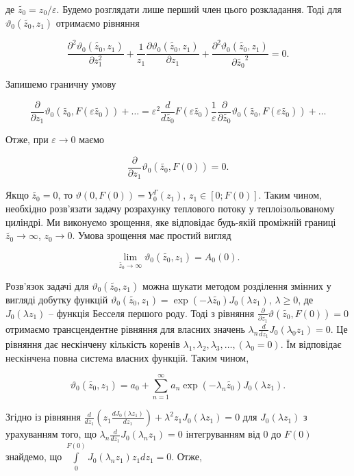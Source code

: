 де $\tilde{z_0} = z_0 / \varepsilon$. Будемо розглядати лише перший член цього розкладання.
Тоді для $\vartheta_0(\tilde{z_0}, z_1)$ отримаємо рівняння

$$
\frac{\partial^2\vartheta_0(\tilde{z_0}, z_1)}{\partial z_1^2} +
\frac{1}{z_1}\frac{\partial\vartheta_0(\tilde{z_0}, z_1)}{\partial z_1} +
\frac{\partial^2\vartheta_0(\tilde{z_0}, z_1)}{\partial\tilde{z_0}^2} = 0.
$$

Запишемо граничну умову

$$
\frac{\partial}{\partial z_1}\vartheta_0(\tilde{z_0}, F(\varepsilon\tilde{z_0})) + \ldots =
\varepsilon^2\frac{d}{d\tilde{z_0}}F(\varepsilon\tilde{z_0})\frac{1}{\varepsilon}\frac{\partial}{\partial\tilde{z_0}}
\vartheta_0(\tilde{z_0}, F(\varepsilon \tilde{z_0})) + \ldots
$$

Отже, при $\varepsilon\to 0$ маємо

$$
\frac{\partial}{\partial z_1}\vartheta_0(\tilde{z_0}, F(0)) = 0.
$$

Якщо $\tilde{z_0} = 0$, то $\vartheta(0, F(0)) = Y_0^\Gamma(z_1)$, $z_1 \in [0; F(0)]$.
Таким чином, необхідно розв’язати задачу розрахунку теплового потоку у теплоізольованому  циліндрі.
Ми виконуємо зрощення, яке відповідає будь-якій проміжній границі $\tilde{z_0} \to \infty$, $z_0 \to 0$.
Умова зрощення має простий вигляд

$$
\lim_{\tilde{z_0} \to \infty} \vartheta_0(\tilde{z_0}, z_1) = A_0(0).
$$

Розв’язок задачі для $\vartheta_0(\tilde{z_0}, z_1)$ можна шукати методом розділення змінних у вигляді
добутку функцій $\vartheta_0(\tilde{z_0}, z_1) = \exp(-\lambda\tilde{z_0})J_0(\lambda z_1)$, $\lambda \geq 0$,
де $J_0(\lambda z_1)$ – функція Бесселя
першого роду. Тоді з рівняння $\frac{\partial}{\partial z_1}\vartheta(\tilde{z_0}, F(0)) = 0$ отримаємо
трансцендентне рівняння для власних значень $\lambda_n\frac{d}{d z_1} J_0(\lambda_0 z_1) = 0$. Це рівняння дає
нескінчену кількість коренів $\lambda_1, \lambda_2, \lambda_3, \ldots, (\lambda_0 = 0)$.
Їм відповідає нескінчена повна система власних функцій. Таким чином,

$$
\vartheta_0(\tilde{z_0}, z_1) = a_0 + \sum_{n = 1}^\infty a_n\exp(-\lambda_n \tilde{z_0}) J_0(\lambda z_1).
$$

Згідно \cite{Coul-Metody} із рівняння
$\frac{d}{d z_1} \left( z_1 \frac{d J_0(\lambda z_1)}{d z_1} \right) + \lambda^2 z_1 J_0(\lambda z_1) = 0$
для $J_0(\lambda z_1)$ з урахуванням того, що
$\lambda_n\frac{d}{d z_1} J_0(\lambda_n z_1) = 0$
інтегруванням від $0$ до $F(0)$ знайдемо, що $\int\limits_0^{F(0)}J_0(\lambda_n z_1) z_1 dz_1 = 0$. Отже,

